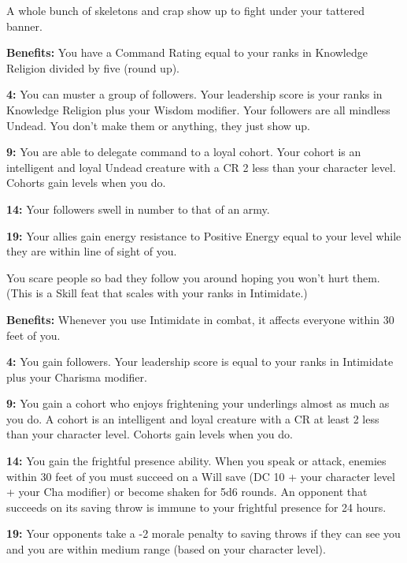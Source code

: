 
A whole bunch of skeletons and crap show up to fight under your tattered banner.

\textbf{Benefits:} You have a Command Rating equal to your ranks in Knowledge Religion divided by five (round up).

\textbf{4:} You can muster a group of followers. Your leadership score is your ranks in Knowledge Religion plus your Wisdom modifier. Your followers are all mindless Undead. You don't make them or anything, they just show up.

\textbf{9:} You are able to delegate command to a loyal cohort. Your cohort is an intelligent and loyal Undead creature with a CR 2 less than your character level. Cohorts gain levels when you do.

\textbf{14:} Your followers swell in number to that of an army.

\textbf{19:} Your allies gain energy resistance to Positive Energy equal to your level while they are within line of sight of you.


You scare people so bad they follow you around hoping you won't hurt them. (This is a Skill feat that scales with your ranks in Intimidate.)

\textbf{Benefits:} Whenever you use Intimidate in combat, it affects everyone within 30 feet of you.

\textbf{4:} You gain followers. Your leadership score is equal to your ranks in Intimidate plus your Charisma modifier.

\textbf{9:} You gain a cohort who enjoys frightening your underlings almost as much as you do. A cohort is an intelligent and loyal creature with a CR at least 2 less than your character level. Cohorts gain levels when you do.

\textbf{14:} You gain the frightful presence ability. When you speak or attack, enemies within 30 feet of you must succeed on a Will save (DC 10 + your character level + your Cha modifier) or become shaken for 5d6 rounds. An opponent that succeeds on its saving throw is immune to your frightful presence for 24 hours.

\textbf{19:} Your opponents take a -2 morale penalty to saving throws if they can see you and you are within medium range (based on your character level).



